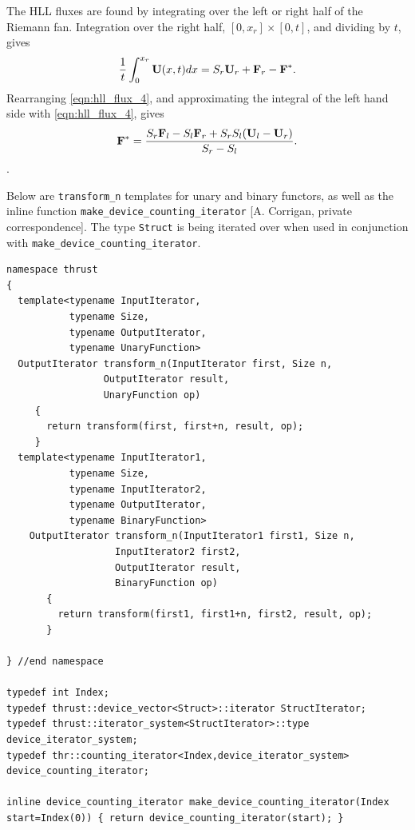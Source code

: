 The HLL fluxes are found by integrating over the left or right half of the Riemann fan.  Integration over the right half, $[0,x_r] \times [0,t]$, and dividing by $t$, gives 
\begin{gather}
\label{eqn:hll_flux_4}
\frac{1}{t}\int_{0}^{x_r} \mathbf{U}(x,t) dx = S_r\mathbf{U}_r + \mathbf{F}_r - \mathbf{F}^*.
\end{gather}
Rearranging \eqref{eqn:hll_flux_4}, and approximating the integral of the left hand side with \eqref{eqn:hll_flux_4}, gives
\begin{gather}
\label{eqn:hll_flux_5}
\mathbf{F}^* = \frac{S_r \mathbf{F}_l - S_l \mathbf{F}_r + S_r S_l (\mathbf{U}_l - \mathbf{U}_r) }{S_r - S_l}.
\end{gather}.

\clearpage

\label{app:thrust_add}

Below are \verb+transform_n+ templates for unary and binary functors, as well as the inline function \verb+make_device_counting_iterator+ [A. Corrigan, private correspondence].  The type \verb+Struct+ is being iterated over when used in conjunction with \verb+make_device_counting_iterator+.
\begin{lstlisting}
namespace thrust
{
  template<typename InputIterator,
           typename Size,
           typename OutputIterator,
           typename UnaryFunction>
  OutputIterator transform_n(InputIterator first, Size n,
			     OutputIterator result,
			     UnaryFunction op)
	 {
	   return transform(first, first+n, result, op);
	 }
  template<typename InputIterator1,
           typename Size,
           typename InputIterator2,
           typename OutputIterator,
           typename BinaryFunction>
    OutputIterator transform_n(InputIterator1 first1, Size n,
			       InputIterator2 first2,
			       OutputIterator result,
			       BinaryFunction op)
	   {
	     return transform(first1, first1+n, first2, result, op);
	   }

} //end namespace

typedef int Index;
typedef thrust::device_vector<Struct>::iterator StructIterator;
typedef thrust::iterator_system<StructIterator>::type device_iterator_system;
typedef thr::counting_iterator<Index,device_iterator_system> device_counting_iterator;

inline device_counting_iterator make_device_counting_iterator(Index start=Index(0)) { return device_counting_iterator(start); }

\end{lstlisting}

